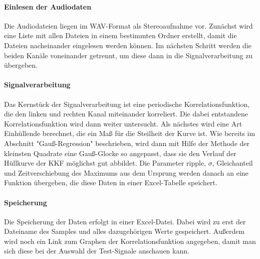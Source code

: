 \documentclass[a4paper, 11pt]{article}
\begin{document}
\paragraph{Einlesen der Audiodaten}
Die Audiodateien liegen im WAV-Format als Stereoaufnahme vor. Zunächst wird eine Liste mit allen Dateien in einem bestimmten Ordner erstellt, damit die Dateien nacheinander eingelesen werden können. Im nächsten Schritt werden die beiden Kanäle voneinander getrennt, um diese dann in die Signalverarbeitung zu übergeben.
\paragraph{Signalverarbeitung}
Das Kernstück der Signalverarbeitung ist eine periodische Korrelationsfunktion, die den linken und rechten Kanal miteinander korreliert. Die dabei entstandene Korrelationsfunktion wird dann weiter untersucht. Als nächstes wird eine Art Einhüllende berechnet, die ein Maß für die Steilheit der Kurve ist. Wie bereits im Abschnitt "Gauß-Regression" beschrieben, wird dann mit Hilfe der Methode der kleinsten Quadrate eine Gauß-Glocke so angepasst, dass sie den Verlauf der Hüllkurve der KKF möglichst gut abbildet. Die Parameter ripple, $\sigma$, Gleichanteil und Zeitverschiebung des Maximums aus dem Ursprung werden danach an eine Funktion übergeben, die diese Daten in einer Excel-Tabelle speichert.
\paragraph{Speicherung}
Die Speicherung der Daten erfolgt in einer Excel-Datei. Dabei wird zu erst der Dateiname des Samples und alles dazugehörigen Werte gespeichert. Außerdem wird noch ein Link zum Graphen der Korrelationsfunktion angegeben, damit man sich diese bei der Auswahl der Test-Signale anschauen kann.
\end{document}
